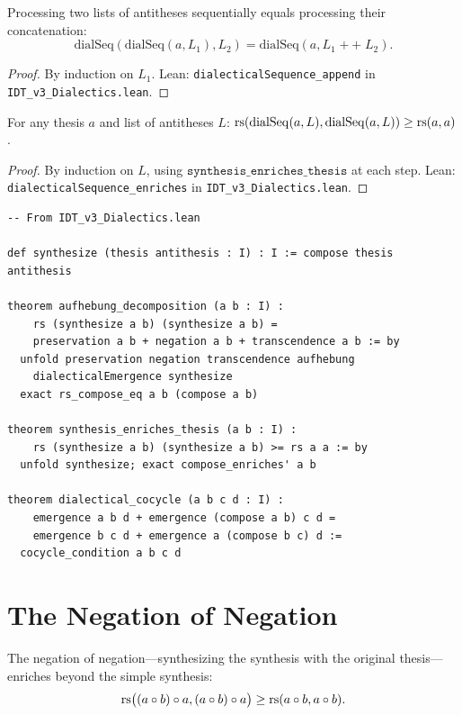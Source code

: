 \begin{theorem}
\label{thm:dial-seq-compose}
Processing two lists of antitheses sequentially equals processing their
concatenation:
\[
\mathrm{dialSeq}(\mathrm{dialSeq}(a, L_1), L_2) = \mathrm{dialSeq}(a, L_1 \mathop{+\!\!+} L_2).
\]
\end{theorem}

\begin{proof}
By induction on $L_1$.
Lean: \texttt{dialecticalSequence\_append} in \texttt{IDT\_v3\_Dialectics.lean}.
\end{proof}

\begin{theorem}
\label{thm:dial-seq-enriches}
For any thesis $a$ and list of antitheses $L$:
$\mathrm{rs}(\mathrm{dialSeq}(a, L), \mathrm{dialSeq}(a, L)) \geq \mathrm{rs}(a, a)$.
\end{theorem}

\begin{proof}
By induction on $L$, using $\texttt{synthesis\_enriches\_thesis}$ at each step.
Lean: \texttt{dialecticalSequence\_enriches} in \texttt{IDT\_v3\_Dialectics.lean}.
\end{proof}

\begin{lstlisting}
-- From IDT_v3_Dialectics.lean

def synthesize (thesis antithesis : I) : I := compose thesis antithesis

theorem aufhebung_decomposition (a b : I) :
    rs (synthesize a b) (synthesize a b) =
    preservation a b + negation a b + transcendence a b := by
  unfold preservation negation transcendence aufhebung
    dialecticalEmergence synthesize
  exact rs_compose_eq a b (compose a b)

theorem synthesis_enriches_thesis (a b : I) :
    rs (synthesize a b) (synthesize a b) >= rs a a := by
  unfold synthesize; exact compose_enriches' a b

theorem dialectical_cocycle (a b c d : I) :
    emergence a b d + emergence (compose a b) c d =
    emergence b c d + emergence a (compose b c) d :=
  cocycle_condition a b c d
\end{lstlisting}

\section{The Negation of Negation}

\begin{theorem}
\label{thm:neg-of-neg}
The negation of negation---synthesizing the synthesis with the original
thesis---enriches beyond the simple synthesis:
\[
\mathrm{rs}\bigl((a \circ b) \circ a, (a \circ b) \circ a\bigr) \geq
\mathrm{rs}(a \circ b, a \circ b).
\]
\end{theorem}

